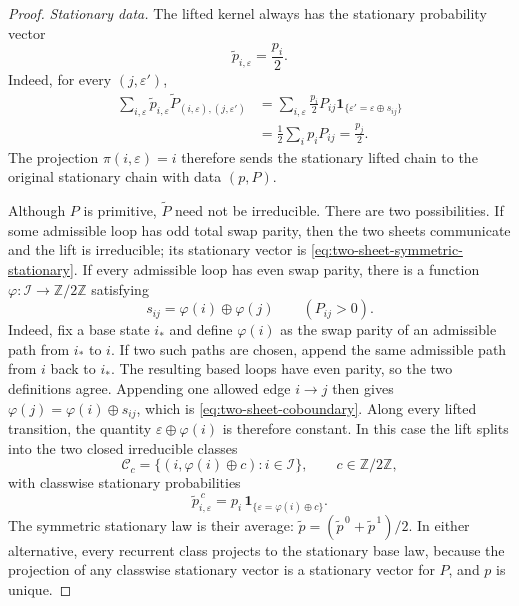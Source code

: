 \documentclass[11pt,a4paper]{amsart}
\theoremstyle{definition}
\theoremstyle{remark}
\numberwithin{equation}{section}
\newcommand{\1}{\boldsymbol 1}
\begin{document}
\begin{proof}
\medskip
\noindent
\emph{Stationary data.}
The lifted kernel always has the stationary probability vector
\begin{equation}\label{eq:two-sheet-symmetric-stationary}
 \widetilde p_{i,\varepsilon}=\frac{p_i}{2}.
\end{equation}
Indeed, for every $(j,\varepsilon')$,
\begin{align*}
 \sum_{i,\varepsilon}
 \widetilde p_{i,\varepsilon}
 \widetilde P_{(i,\varepsilon),(j,\varepsilon')}
 &=\sum_{i,\varepsilon}
   \frac{p_i}{2}P_{ij}
   \1_{\{\varepsilon'=\varepsilon\oplus s_{ij}\}}\\
 &=\frac12\sum_i p_iP_{ij}
  =\frac{p_j}{2}.
\end{align*}
The projection $\pi(i,\varepsilon)=i$ therefore sends the stationary
lifted chain to the original stationary chain with data $(p,P)$.

Although $P$ is primitive, $\widetilde P$ need not be irreducible.
There are two possibilities.  If some admissible loop has odd total
swap parity, then the two sheets communicate and the lift is
irreducible; its stationary vector is \eqref{eq:two-sheet-symmetric-stationary}.
If every admissible loop has even swap parity, there is a function
$\varphi:\mathcal I\to\mathbb Z/2\mathbb Z$ satisfying
\begin{equation}\label{eq:two-sheet-coboundary}
 s_{ij}=\varphi(i)\oplus\varphi(j)
 \qquad(P_{ij}>0).
\end{equation}
Indeed, fix a base state $i_*$ and define $\varphi(i)$ as the
swap parity of an admissible path from $i_*$ to $i$.  If two such
paths are chosen, append the same admissible path from $i$ back to
$i_*$.  The resulting based loops have even parity, so the two
definitions agree.  Appending one allowed edge $i\to j$ then gives
$\varphi(j)=\varphi(i)\oplus s_{ij}$, which is
\eqref{eq:two-sheet-coboundary}.  Along every lifted transition, the
quantity $\varepsilon\oplus\varphi(i)$ is therefore constant.
In this case the lift splits into the two closed irreducible classes
$$
 \mathcal C_c
 =\{(i,\varphi(i)\oplus c):i\in\mathcal I\},
 \qquad c\in\mathbb Z/2\mathbb Z,
$$
with classwise stationary probabilities
\begin{equation}\label{eq:two-sheet-class-stationary}
 \widetilde p^{\,c}_{i,\varepsilon}
 =p_i\,
  \1_{\{\varepsilon=\varphi(i)\oplus c\}}.
\end{equation}
The symmetric stationary law is their average:
$\widetilde p=(\widetilde p^{\,0}+\widetilde p^{\,1})/2$.
In either alternative, every recurrent class projects to the stationary
base law, because the projection of any classwise stationary vector is
a stationary vector for $P$, and $p$ is unique.


\end{proof}
\end{document}
